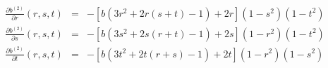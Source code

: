 \begin{eqnarray}
\frac{\partial b^{(2)}}{\partial r}(r,s,t) &=&  -[b(3r^2+2r(s+t)-1)+2r](1-s^2)(1-t^2)\\
\frac{\partial b^{(2)}}{\partial s}(r,s,t) &=&  -[b(3s^2+2s(r+t)-1)+2s](1-r^2)(1-t^2)\\
\frac{\partial b^{(2)}}{\partial t}(r,s,t) &=&  -[b(3t^2+2t(r+s)-1)+2t](1-r^2)(1-s^2)
\end{eqnarray}












